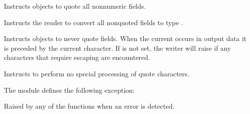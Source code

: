 \documentclass[letterpaper,10pt,english]{sphinxmanual}
\begin{document}

\begin{fulllineitems}
\label{\detokenize{csv:csv.QUOTE_NONNUMERIC}}
Instructs {\hyperref[\detokenize{csv:csv.writer}]{}} objects to quote all non\sphinxhyphen{}numeric fields.

Instructs the reader to convert all non\sphinxhyphen{}quoted fields to type .

\end{fulllineitems}


\begin{fulllineitems}
\label{\detokenize{csv:csv.QUOTE_NONE}}
Instructs {\hyperref[\detokenize{csv:csv.writer}]{}} objects to never quote fields.  When the current
 occurs in output data it is preceded by the current 
character.  If  is not set, the writer will raise {\hyperref[\detokenize{csv:csv.Error}]{}} if
any characters that require escaping are encountered.

Instructs {\hyperref[\detokenize{csv:csv.reader}]{}} to perform no special processing of quote characters.

\end{fulllineitems}


The {\hyperref[\detokenize{csv:module-csv}]{}} module defines the following exception:

\begin{fulllineitems}
\label{\detokenize{csv:csv.Error}}
Raised by any of the functions when an error is detected.

\end{fulllineitems}
\end{document}
